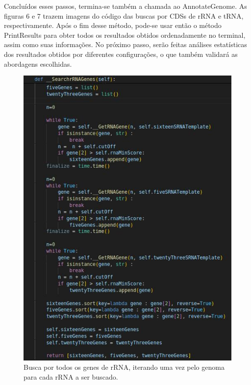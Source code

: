 \documentclass[brazilian,12pt,a4paper,final]{article}
\begin{document}
\vspace{0.5cm}

Concluídos esses passos, termina-se também a chamada ao AnnotateGenome. As figuras 6 e 7 trazem imagens do código das buscas por CDSs de rRNA e tRNA, respectivamente. Após o fim desse método, pode-se usar então o método PrintResults para obter todos os resultados obtidos ordenadamente no terminal, assim como suas informações. No próximo passo, serão feitas análises estatísticas dos resultados obtidos por diferentes configurações, o que também validará as abordagens escolhidas.

\begin{figure}[hbtp]
	\begin{center}
		\includegraphics[]{SearchrRNAGenes.jpeg}
		\caption{Busca por todos os genes de rRNA, iterando uma vez pelo genoma para cada rRNA a ser buscado.}
		\label{fig}
	\end{center}
\end{figure}
\end{document}
